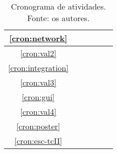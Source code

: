 \begin{table}[!htbp]
\begin{tabular}{|c|c|c|c|c|c|}
        \hline
        \ref{cron:network}      &                           &                     & \cellcolor{midgray} &                     &                     \\
        \hline
        \ref{cron:val2}         &                           &                     & \cellcolor{midgray} &                     &                     \\
        \hline
        \ref{cron:integration}  &                           &                     &                     & \cellcolor{midgray} &                     \\
        \hline
        \ref{cron:val3}         &                           &                     &                     & \cellcolor{midgray} &                     \\
        \hline
        \ref{cron:gui}          &                           &                     &                     & \cellcolor{midgray} &                     \\
        \hline
        \ref{cron:val4}         &                           &                     &                     & \cellcolor{midgray} &                     \\
        \hline
        \ref{cron:poster}       &                           &                     &                     & \cellcolor{midgray} &                     \\
        \hline
        \ref{cron:esc-tcII}     &                           &                     &                     &                     & \cellcolor{midgray} \\
        \hline
    \end{tabular}
    \caption{\label{tab:schedule}
        Cronograma de atividades.\\
        Fonte: os autores.
    }
\end{table}
